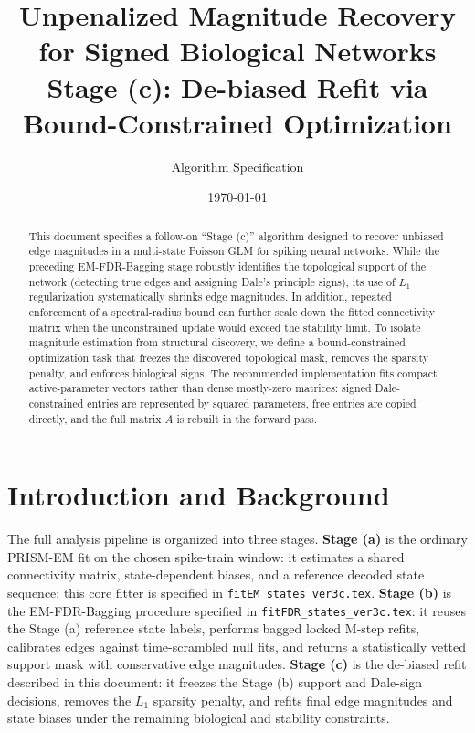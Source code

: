 \documentclass[11pt]{article}
\title{Unpenalized Magnitude Recovery for Signed Biological Networks\\
\large Stage (c): De-biased Refit via Bound-Constrained Optimization}
\author{Algorithm Specification}
\date{\today}
\begin{document}
\maketitle

\begin{abstract}
This document specifies a follow-on ``Stage (c)'' algorithm designed to recover unbiased edge magnitudes in a multi-state Poisson GLM for spiking neural networks. While the preceding EM-FDR-Bagging stage robustly identifies the topological support of the network (detecting true edges and assigning Dale's principle signs), its use of $L_1$ regularization systematically shrinks edge magnitudes. In addition, repeated enforcement of a spectral-radius bound can further scale down the fitted connectivity matrix when the unconstrained update would exceed the stability limit. To isolate magnitude estimation from structural discovery, we define a bound-constrained optimization task that freezes the discovered topological mask, removes the sparsity penalty, and enforces biological signs. The recommended implementation fits compact active-parameter vectors rather than dense mostly-zero matrices: signed Dale-constrained entries are represented by squared parameters, free entries are copied directly, and the full matrix $A$ is rebuilt in the forward pass.
\end{abstract}

\section{Introduction and Background}

The full analysis pipeline is organized into three stages. \textbf{Stage (a)}
is the ordinary PRISM-EM fit on the chosen spike-train window: it estimates a
shared connectivity matrix, state-dependent biases, and a reference decoded
state sequence; this core fitter is specified in
\texttt{fitEM\_states\_ver3c.tex}. \textbf{Stage (b)} is the
EM-FDR-Bagging procedure specified in
\texttt{fitFDR\_states\_ver3c.tex}: it reuses the Stage (a) reference state
labels, performs bagged locked M-step refits, calibrates edges against
time-scrambled null fits, and returns a statistically vetted support mask
with conservative edge magnitudes. \textbf{Stage (c)} is the de-biased
refit described in this document: it freezes the Stage (b) support and
Dale-sign decisions, removes the \(L_1\) sparsity penalty, and refits final
edge magnitudes and state biases under the remaining biological and
stability constraints.
\end{document}
